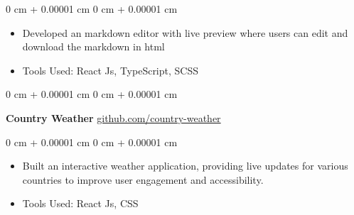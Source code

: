 \documentclass[10pt, letterpaper]{article}
\newenvironment{highlights}{
    \begin{itemize}[
        topsep=0.10 cm,
        parsep=0.10 cm,
        partopsep=0pt,
        itemsep=0pt,
        leftmargin=0 cm + 10pt
    ]
}{
    \end{itemize}
} %
\newenvironment{highlightsforbulletentries}{
    \begin{itemize}[
        topsep=0.10 cm,
        parsep=0.10 cm,
        partopsep=0pt,
        itemsep=0pt,
        leftmargin=10pt
    ]
}{
    \end{itemize}
} %
\newenvironment{onecolentry}{
    \begin{adjustwidth}{
        0 cm + 0.00001 cm
    }{
        0 cm + 0.00001 cm
    }
}{
    \end{adjustwidth}
} %
\newenvironment{twocolentry}[2][]{
    \onecolentry
    \def\secondColumn{#2}
    \setcolumnwidth{\fill, 4.5 cm}
    \begin{paracol}{2}
}{
    \switchcolumn \raggedleft \secondColumn
    \end{paracol}
    \endonecolentry
} %
\begin{document}
        \vspace{0.10 cm}
        \begin{onecolentry}
            \begin{highlights}
                \item Developed an markdown editor with live preview where users can edit and download the markdown in html
                \item Tools Used: React Js, TypeScript, SCSS
            \end{highlights}
        \end{onecolentry}


        \vspace{0.2 cm}

        \begin{twocolentry}{
            \href{https://github.com/glunkad/fullstackopen/tree/main/part2/countryinfo/src}{github.com/country-weather}
        }
            \textbf{Country Weather}\end{twocolentry}

        \vspace{0.10 cm}
        \begin{onecolentry}
            \begin{highlights}
                \item Built an interactive weather application, providing live updates for various countries to improve user engagement and accessibility.
                \item Tools Used: React Js, CSS
            \end{highlights}
        \end{onecolentry}
    




\end{document}
